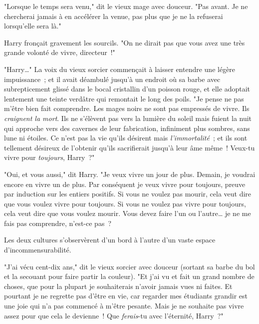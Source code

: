 "Lorsque le temps sera venu," dit le vieux mage avec douceur. "Pas avant. Je ne chercherai jamais à en accélérer la venue, pas plus que je ne la refuserai lorsqu'elle sera là."

Harry fronçait gravement les sourcils. "On ne dirait pas que vous avez une très grande volonté de vivre, directeur~!"

"Harry…" La voix du vieux sorcier commençait à laisser entendre une légère impuissance~; et il avait déambulé jusqu'à un endroit où sa barbe avec subrepticement glissé dans le bocal cristallin d'un poisson rouge, et elle adoptait lentement une teinte verdâtre qui remontait le long des poils. "Je pense ne pas m'être bien fait comprendre. Les mages noirs ne sont pas empressés de vivre. Ils \emph{craignent la mort}. Ils ne s'élèvent pas vers la lumière du soleil mais fuient la nuit qui approche vers des cavernes de leur fabrication, infiniment plus sombres, sans lune ni étoiles. Ce n'est pas la vie qu'ils désirent mais \emph{l'immortalité}~; et ils sont tellement désireux de l'obtenir qu'ils sacrifierait jusqu'à leur âme même~! Veux-tu vivre pour \emph{toujours}, Harry~?"

"Oui, et vous aussi," dit Harry. "Je veux vivre un jour de plus. Demain, je voudrai encore en vivre un de plus. Par conséquent je veux vivre pour toujours, preuve par induction sur les entiers positifs. Si vous ne voulez pas mourir, cela veut dire que vous voulez vivre pour toujours. Si vous ne voulez pas vivre pour toujours, cela veut dire que vous voulez mourir. Vous devez faire l'un ou l'autre… je ne me fais pas comprendre, n'est-ce pas~?

Les deux cultures s'observèrent d'un bord à l'autre d'un vaste espace d'incommensurabilité.

"J'ai vécu cent-dix ans," dit le vieux sorcier avec douceur (sortant sa barbe du bol et la secouant pour faire partir la couleur). "Et j'ai vu et fait un grand nombre de choses, que pour la plupart je souhaiterais n'avoir jamais vues ni faites. Et pourtant je ne regrette pas d'être en vie, car regarder mes étudiants grandir est une joie qui n'a pas commencé à m'être pesante. Mais je ne souhaite pas vivre assez pour que cela le devienne~! Que \emph{ferais}-tu avec l'éternité, Harry~?"

